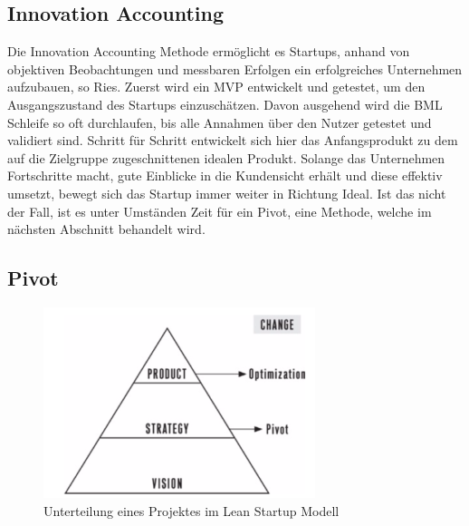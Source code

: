 
\subsection*{\label{sec:LeanStartup-InnovationAccounting}\thesubsection\quad Innovation Accounting}
Die Innovation Accounting Methode ermöglicht es Startups, anhand von objektiven Beobachtungen und messbaren Erfolgen ein erfolgreiches Unternehmen aufzubauen, so Ries. Zuerst wird ein \ac{MVP} entwickelt und getestet, um den Ausgangszustand des Startups einzuschätzen. Davon ausgehend wird die \ac{BML} Schleife so oft durchlaufen, bis alle Annahmen über den Nutzer getestet und validiert sind. Schritt für Schritt entwickelt sich hier das Anfangsprodukt zu dem auf die Zielgruppe zugeschnittenen idealen Produkt. Solange das Unternehmen Fortschritte macht, gute Einblicke in die Kundensicht erhält und diese effektiv umsetzt, bewegt sich das Startup immer weiter in Richtung Ideal. Ist das nicht der Fall, ist es unter Umständen Zeit für ein Pivot, eine Methode, welche im nächsten Abschnitt behandelt wird.

\subsection*{\label{sec:LeanStartup-Pivot}\thesubsection\quad Pivot}
\begin{figure}
	\begin{center}
		\includegraphics[scale=1]{99_IMG/02_Grundlagen/visionStrategyProduct.png}
		\caption{Unterteilung eines Projektes im Lean Startup Modell}
		\label{fig:LeanStartup_VisionStrategyProduct}
	\end{center}
\end{figure}

